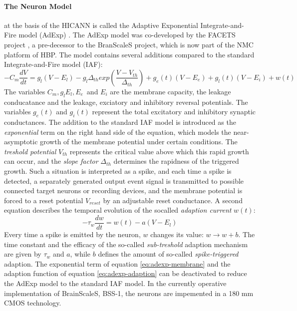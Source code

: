 \paragraph{The Neuron Model}\label{sect:adexp} at the basis of the HICANN is called the Adaptive Exponential Integrate-and-Fire model (AdExp) \cite{brette_adaptive_2005}.
The AdExp model was co-developed by the FACETS project \cite{schemmel_wafer-scale_2010}, a pre-decessor to the BranScaleS project, which is now part of the NMC platform of HBP.
The model contains several additions compared to the standard Integrate-and-Fire model (IAF):
\begin{equation}\label{eq:adexp-membrane}
-C_m\frac{dV}{dt} = g_l(V-E_l) - g_l\Delta_{th}exp(\frac{V-V_{th}}{\Delta_{th}}) + g_e(t)(V-E_e)+g_l(t)(V-E_i)+w(t)
\end{equation}
The variables $C_m, g_l E_l, E_e$ and $E_i$ are the membrane capacity, the leakage conducatance and the leakage, exciatory and inhibitory reversal potentials.
The variables $g_e(t)$ and $g_i(t)$ represent the total excitatory and inhibitory synaptic conductances.
The addition to the standard IAF model is introduced as the \textit{exponential} term on the right hand side of the equation, which models the near-asymptotic growth of the membrane potential under certain conditions.
The \textit{treshold potential} $V_{th}$ represents the critical value above which this rapid growth can occur, and the \textit{slope factor} $\Delta_{th}$ determines the rapidness of the triggered growth.
Such a situation is interpreted as a spike, and each time a spike is detected, a separately generated output event signal is transmitted to possible connected target neurons or recording devices, and the membrane potential is forced to a reset potential $V_{reset}$ by an adjustable reset conductance.
A second equation describes the temporal evolution of the socalled \textit{adaption current} $w(t)$:
\begin{equation}\label{eq:adexp-adaption}
-\tau_{w}\frac{dw}{dt} = w(t) - a(V-E_l)
\end{equation}
Every time a spike is emitted by the neuron, $w$ changes its value: $w \rightarrow w + b$.
The time constant and the efficacy of the so-called \textit{sub-treshold} adaption mechanism are given by $\tau_w$ and $a$, while $b$ defines the amount of so-called \textit{spike-triggered} adaption.
The exponential term of equation \ref{eq:adexp-membrane} and the adaption function of equation \ref{eq:adexp-adaption} can be deactivated to reduce the AdExp model to the standard IAF model.
\cite{schemmel_wafer-scale_2010}\cite{brette_adaptive_2005}
In the currently operative implementation of BrainScaleS, BSS-1, the neurons are impemented in a 180 mm CMOS technology.

